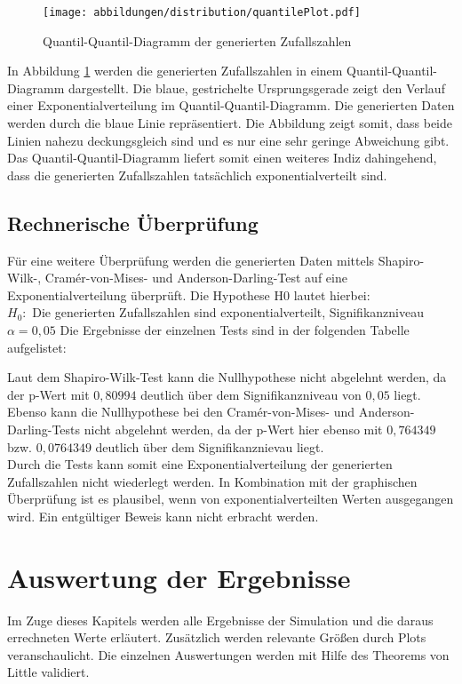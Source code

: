 \begin{figure}[htpb]
	\centering
	\texttt{[image: abbildungen/distribution/quantilePlot.pdf]}
	\caption{Quantil-Quantil-Diagramm der generierten Zufallszahlen}
	\label{fig:QQPlot}
\end{figure}

In Abbildung \ref{fig:QQPlot} werden die generierten Zufallszahlen in einem Quantil-Quantil-Diagramm dargestellt. Die blaue, gestrichelte Ursprungsgerade zeigt den Verlauf einer Exponentialverteilung im Quantil-Quantil-Diagramm. Die generierten Daten werden durch die blaue Linie repräsentiert. Die Abbildung zeigt somit, dass beide Linien nahezu deckungsgleich sind und es nur eine sehr geringe Abweichung gibt. Das Quantil-Quantil-Diagramm liefert somit einen weiteres Indiz dahingehend, dass die generierten Zufallszahlen tatsächlich exponentialverteilt sind.

\subsection{Rechnerische Überprüfung}
Für eine weitere Überprüfung werden die generierten Daten mittels Shapiro-Wilk-, Cramér-von-Mises- und Anderson-Darling-Test auf eine Exponentialverteilung überprüft. Die Hypothese H0 lautet hierbei: \\
$H_0:$ Die generierten Zufallszahlen sind exponentialverteilt, Signifikanzniveau $\alpha =0,05$ Die Ergebnisse der einzelnen Tests sind in der folgenden Tabelle aufgelistet: 


Laut dem Shapiro-Wilk-Test kann die Nullhypothese nicht abgelehnt werden, da der p-Wert mit $0,80994$ deutlich über dem Signifikanzniveau von $0,05$ liegt. Ebenso kann die Nullhypothese bei den Cramér-von-Mises- und Anderson-Darling-Tests nicht abgelehnt werden, da der p-Wert hier ebenso mit $0,764349$ bzw. $0,0764349$ deutlich über dem Signifikanznievau liegt.\\
Durch die Tests kann somit eine Exponentialverteilung der generierten Zufallszahlen nicht wiederlegt werden. In Kombination mit der graphischen Überprüfung ist es plausibel, wenn von exponentialverteilten Werten ausgegangen wird. Ein entgültiger Beweis kann nicht erbracht werden.

\section{Auswertung der Ergebnisse}
Im Zuge dieses Kapitels werden alle Ergebnisse der Simulation und die daraus errechneten Werte erläutert. Zusätzlich werden relevante Größen durch Plots veranschaulicht. Die einzelnen Auswertungen werden mit Hilfe des Theorems von Little validiert.

